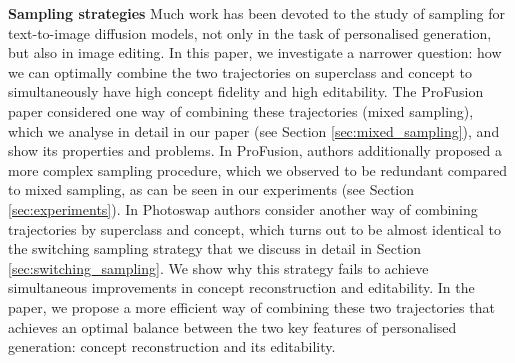 \textbf{Sampling strategies}
Much work has been devoted to the study of sampling for text-to-image diffusion models, not only in the task of personalised generation, but also in image editing. In this paper, we investigate a narrower question: how we can optimally combine the two trajectories on superclass and concept to simultaneously have high concept fidelity and high editability. The ProFusion paper \cite{profusion} considered one way of combining these trajectories (mixed sampling), which we analyse in detail in our paper (see Section \ref{sec:mixed_sampling}), and show its properties and problems. In ProFusion, authors additionally proposed a more complex sampling procedure, which we observed to be redundant compared to mixed sampling, as can be seen in our experiments (see Section \ref{sec:experiments}). In Photoswap \cite{photoswap} authors consider another way of combining trajectories by superclass and concept, which turns out to be almost identical to the switching sampling strategy that we discuss in detail in Section \ref{sec:switching_sampling}. We show why this strategy fails to achieve simultaneous improvements in concept reconstruction and editability. In the paper, we propose a more efficient way of combining these two trajectories that achieves an optimal balance between the two key features of personalised generation: concept reconstruction and its editability.
